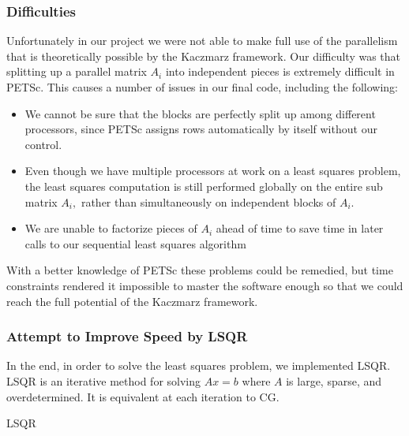 \documentclass[a4paper,12pt]{article}
\begin{document}
\subsubsection*{Difficulties}

Unfortunately in our project we were not able to make full use of the parallelism that is theoretically possible by the Kaczmarz framework. Our difficulty was that splitting up a parallel matrix $A_i$ into independent pieces is extremely difficult in PETSc. This causes a number of issues in our final code, including the following:

\begin{itemize}
\item We cannot be sure that the blocks are perfectly split up among different processors, since PETSc assigns rows automatically by itself without our control.
\item Even though we have multiple processors at work on a least squares problem, the least squares computation is still performed globally on the entire sub matrix $A_i,$ rather than simultaneously on independent blocks of $A_i$.
\item We are unable to factorize pieces of $A_i$ ahead of time to save time in later calls to our sequential least squares algorithm
\end{itemize}

With a better knowledge of PETSc these problems could be remedied, but time constraints rendered it impossible to master the software enough so that we could reach the full potential of the Kaczmarz framework.

\subsubsection{Attempt to Improve Speed by LSQR}

In the end, in order to solve the least squares problem, we implemented LSQR. LSQR is an iterative method for solving $Ax = b$ where $A$ is large, sparse, and overdetermined. It is equivalent at each iteration to CG. 


\begin{algorithm}
\caption{LSQR}
\begin{algorithmic}[1]
\EndFor

\end{algorithmic}
\end{algorithm}
\end{document}
